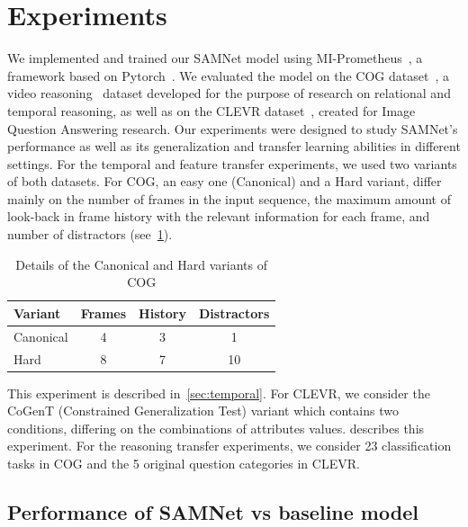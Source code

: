 \section{Experiments}
\label{sec:experiments}
We implemented and trained our SAMNet model using MI-Prometheus~\cite{kornuta2018accelerating}, a framework based on Pytorch~\cite{paszke2017automatic}. We evaluated the model on the COG dataset~\cite{yang2018dataset}, a video reasoning~\cite{mogadala2019trends} dataset developed for the purpose of research on relational and temporal reasoning, as well as on the CLEVR dataset~\cite{johnson2017clevr}, created for Image Question Answering research.
Our experiments were designed to study SAMNet's performance as well as its generalization and transfer learning abilities in different settings.
For the temporal and feature transfer experiments, we used two variants of both datasets.
For COG, an easy one (Canonical) and a Hard variant, differ mainly on the number of frames in the input sequence, the maximum amount of look-back in frame history with the relevant information for each frame, and number of distractors (see~\cref{tab:cog_variants}).
\begin{table}[ht]
	\centering
		\begin{tabular}{lccc}
			\toprule
			Variant	& Frames & History	& Distractors \\ 
			\midrule
			Canonical & 4 & 3 & 1\\	
			Hard  & 8 & 7 & 10\\
			\bottomrule	
		\end{tabular}
	\caption{Details of the Canonical and Hard variants of COG}
	\label{tab:cog_variants}
\end{table}\vspace{5pt}
This experiment is described in~\cref{sec:temporal}.
For CLEVR, we consider the CoGenT (Constrained Generalization Test) variant which contains two conditions, differing on the combinations of attributes values.
 describes this experiment.
For the reasoning transfer experiments, we consider 23 classification tasks in COG and the 5 original question categories in CLEVR.

\subsection{Performance of SAMNet vs baseline model~\cite{yang2018dataset}}
\label{sec:cog-baseline-compare}

